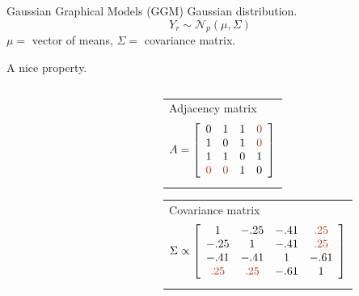 \documentclass{beamer}
\newcommand{\edgeunit}{1.5}
\newcommand{\emphase}[1]{\textcolor{Complement}{#1}}
\newcommand{\Ncal}{\mathcal{N}}
\begin{document}
\begin{frame}{Gaussian Graphical Models (GGM)}
   \emphase{Gaussian distribution.}
  $$
  Y_r \sim \Ncal_p(\mu, \Sigma)
  $$
  $\mu =$ vector of means, $\Sigma =$ covariance matrix.
  
  \bigskip \bigskip %
  \emphase{A nice property.} ~ \\

  \begin{columns}
  \begin{column}{0.05\textwidth}
	
\end{column}
  \begin{column}{0.4\textwidth}
    \end{column}
    \begin{column}{12cm}
    \flushright
    \begin{overprint}
    \begin{tabular}{p{}}
	 Adjacency matrix
	 $$
	 A = \left[ \begin{array}{cccc}
	 0 & 1 & 1 & \emphase{0} \\
	 1 & 0 & 1 & \emphase{0} \\
	 1 & 1 & 0 & 1 \\
	 \emphase{0} & \emphase{0} & 1 & 0 
	 \end{array} \right]
	 $$
    \end{tabular} 
    \begin{tabular}{p{}}
	 Covariance matrix
	 $$
	 \Sigma \propto \left[ \begin{array}{cccc}
	   1 & -.25 & -.41 &  \emphase{.25} \\
	   -.25 &  1 & -.41 &  \emphase{.25} \\
	   -.41 & -.41 &  1 & -.61 \\
	   \emphase{.25} &  \emphase{.25} & -.61 &  1
	   \end{array} \right] 
$$
\end{tabular}
\end{overprint}
\end{column}
\end{columns}
\end{frame}
\end{document}
